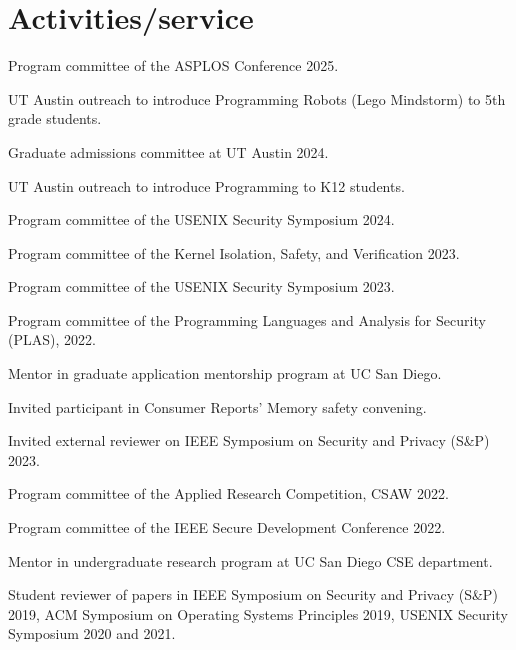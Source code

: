 \section{Activities/service}


{ Program committee of the ASPLOS Conference 2025. }

{ UT Austin
outreach to introduce Programming Robots (Lego Mindstorm) to 5th grade students.
}

{ Graduate admissions committee at UT Austin 2024. }

{ UT Austin
outreach to introduce Programming to K12 students. }

{ Program committee of the USENIX Security Symposium 2024. }

{ Program committee of the Kernel Isolation, Safety, and Verification 2023. }

{ Program committee of the USENIX Security Symposium 2023. }

{ Program committee of the Programming Languages and Analysis for Security (PLAS), 2022. }

{ Mentor in 
graduate application mentorship program at UC San Diego. }

{ Invited participant in Consumer Reports' Memory safety convening. }

{ Invited external reviewer on IEEE Symposium on Security and Privacy (S\&P) 2023.}

{ Program committee of the Applied Research Competition, CSAW 2022. }

{ Program committee of the IEEE Secure Development Conference 2022. }

{ Mentor in  undergraduate research program at UC San Diego CSE department. }

{ Student reviewer of papers in IEEE Symposium on Security and Privacy (S\&P)
2019, ACM Symposium on Operating Systems Principles 2019, USENIX Security
Symposium 2020 and 2021. }
